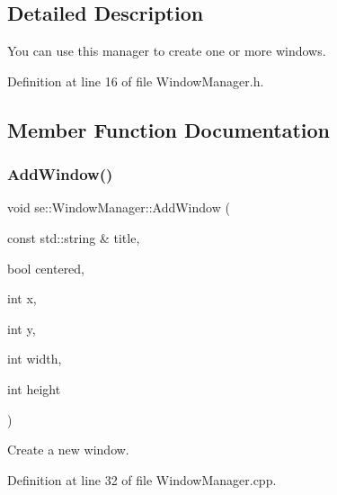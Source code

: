 \subsection{Detailed Description}
You can use this manager to create one or more windows. 

Definition at line 16 of file Window\+Manager.\+h.



\subsection{Member Function Documentation}
\mbox{\label{classse_1_1_window_manager_a49c863f687b26c958c02b6f0a3cc9af6}} 
\subsubsection{\texorpdfstring{Add\+Window()}{AddWindow()}\hspace{0.1cm}{\footnotesize\ttfamily [1/2]}}
{\footnotesize\ttfamily void se\+::\+Window\+Manager\+::\+Add\+Window (\begin{DoxyParamCaption}\item[{const std\+::string \&}]{title,  }\item[{bool}]{centered,  }\item[{int}]{x,  }\item[{int}]{y,  }\item[{int}]{width,  }\item[{int}]{height }\end{DoxyParamCaption})}

Create a new window. 

Definition at line 32 of file Window\+Manager.\+cpp.

\mbox{\label{classse_1_1_window_manager_aeee5f919f5395aa866e0d0cd06e3e5c3}} 
